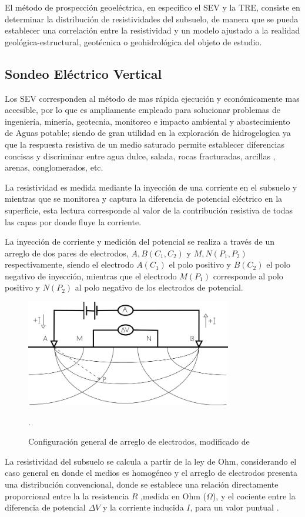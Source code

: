 			El método de prospección geoeléctrica, en especifico el SEV y la TRE, consiste en determinar la distribución de resistividades del subsuelo, de manera que se pueda establecer una correlación entre la resistividad y un modelo ajustado a la realidad geológica-estructural, geotécnica o geohidrológica del objeto de estudio.
	
		\subsection{Sondeo Eléctrico Vertical}
			
			Los SEV corresponden al método de mas rápida ejecución y económicamente mas accesible, por lo que es ampliamente empleado para solucionar problemas de ingeniería, minería, geotecnia, monitoreo e impacto ambiental y abastecimiento de Aguas potable; siendo de gran utilidad en la exploración de hidrogelogica ya que la respuesta resistiva de un medio saturado permite establecer diferencias concisas y discriminar entre agua dulce, salada, rocas fracturadas, arcillas , arenas, conglomerados, etc.
			
			La resistividad es medida mediante la inyección de una corriente en el subsuelo y mientras que se monitorea y captura la diferencia de potencial eléctrico en la superficie, esta lectura corresponde al valor de la contribución resistiva de todas las capas por donde fluye la corriente.
			
			La inyección de corriente y medición del potencial se realiza a través de un arreglo de dos pares de electrodos, $A, B (C_{1}, C_{2})$ y $M, N (P_{1}, P_{2}) $ respectivamente, siendo el electrodo $A (C_{1})$ el polo positivo y $B (C_{2})$ el polo negativo de inyección, mientras que el electrodo $M (P_{1})$ corresponde al polo positivo y $N (P_{2})$ al polo negativo de los electrodos de potencial.\\
			 
			\begin{figure}[h!]
				\centering
				\includegraphics[width=9cm]{Imagenes/ArregloElectrodos}
				\caption[Configuración general de electrodos]{Configuración general de arreglo de electrodos, modificado de \citet{reynolds2011}}.
				\label{fig:AE}
			\end{figure}
			La resistividad del subsuelo se calcula a partir de la ley de Ohm, considerando el caso general en donde el medios es homogéneo y el arreglo de electrodos presenta una distribución convencional, donde se establece una relación directamente proporcional entre la la resistencia $R$ ,medida en Ohm ($\Omega$), y el cociente entre la diferencia de potencial $\Delta V$ y la corriente inducida $I$, para un valor puntual \citep{igboama2023}.
			
